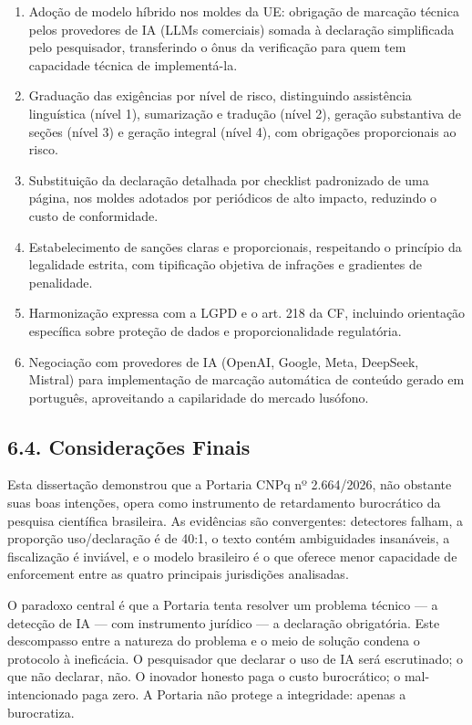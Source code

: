 \documentclass[
  12pt,
  a4paper,
  brazil,
  twoside
]{report}
\begin{document}
\begin{enumerate}
\def\labelenumi{\arabic{enumi}.}
\item
  Adoção de modelo híbrido nos moldes da UE: obrigação de marcação
  técnica pelos provedores de IA (LLMs comerciais) somada à declaração
  simplificada pelo pesquisador, transferindo o ônus da verificação para
  quem tem capacidade técnica de implementá-la.
\item
  Graduação das exigências por nível de risco, distinguindo assistência
  linguística (nível 1), sumarização e tradução (nível 2), geração
  substantiva de seções (nível 3) e geração integral (nível 4), com
  obrigações proporcionais ao risco.
\item
  Substituição da declaração detalhada por checklist padronizado de uma
  página, nos moldes adotados por periódicos de alto impacto, reduzindo
  o custo de conformidade.
\item
  Estabelecimento de sanções claras e proporcionais, respeitando o
  princípio da legalidade estrita, com tipificação objetiva de infrações
  e gradientes de penalidade.
\item
  Harmonização expressa com a LGPD e o art. 218 da CF, incluindo
  orientação específica sobre proteção de dados e proporcionalidade
  regulatória.
\item
  Negociação com provedores de IA (OpenAI, Google, Meta, DeepSeek,
  Mistral) para implementação de marcação automática de conteúdo gerado
  em português, aproveitando a capilaridade do mercado lusófono.
\end{enumerate}

\subsection{6.4. Considerações Finais}\label{considerauxe7uxf5es-finais}

Esta dissertação demonstrou que a Portaria CNPq nº 2.664/2026, não
obstante suas boas intenções, opera como instrumento de retardamento
burocrático da pesquisa científica brasileira. As evidências são
convergentes: detectores falham, a proporção uso/declaração é de 40:1, o
texto contém ambiguidades insanáveis, a fiscalização é inviável, e o
modelo brasileiro é o que oferece menor capacidade de enforcement entre
as quatro principais jurisdições analisadas.

O paradoxo central é que a Portaria tenta resolver um problema técnico
--- a detecção de IA --- com instrumento jurídico --- a declaração
obrigatória. Este descompasso entre a natureza do problema e o meio de
solução condena o protocolo à ineficácia. O pesquisador que declarar o
uso de IA será escrutinado; o que não declarar, não. O inovador honesto
paga o custo burocrático; o mal-intencionado paga zero. A Portaria não
protege a integridade: apenas a burocratiza.
\end{document}
